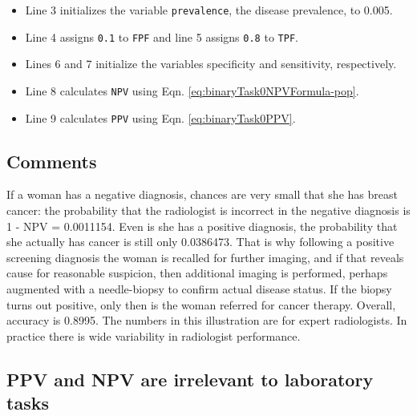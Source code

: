 \documentclass[
]{book}
\providecommand{\tightlist}{%
  \setlength{\itemsep}{0pt}\setlength{\parskip}{0pt}}
\begin{document}
\begin{itemize}
\tightlist
\item
  Line 3 initializes the variable \texttt{prevalence}, the disease prevalence, to 0.005.
\item
  Line 4 assigns \texttt{0.1} to \texttt{FPF} and line 5 assigns \texttt{0.8} to \texttt{TPF}.
\item
  Lines 6 and 7 initialize the variables specificity and sensitivity, respectively.
\item
  Line 8 calculates \texttt{NPV} using Eqn. \eqref{eq:binaryTask0NPVFormula-pop}.
\item
  Line 9 calculates \texttt{PPV} using Eqn. \eqref{eq:binaryTask0PPV}.
\end{itemize}

\hypertarget{binaryTask0NpvPpvComments}{%
\subsection{Comments}\label{binaryTask0NpvPpvComments}}

If a woman has a negative diagnosis, chances are very small that she has breast cancer: the probability that the radiologist is incorrect in the negative diagnosis is 1 - NPV = 0.0011154. Even is she has a positive diagnosis, the probability that she actually has cancer is still only 0.0386473. That is why following a positive screening diagnosis the woman is recalled for further imaging, and if that reveals cause for reasonable suspicion, then additional imaging is performed, perhaps augmented with a needle-biopsy to confirm actual disease status. If the biopsy turns out positive, only then is the woman referred for cancer therapy. Overall, accuracy is 0.8995. The numbers in this illustration are for expert radiologists. In practice there is wide variability in radiologist performance.

\hypertarget{binaryTask0NpvPpvIrrel2LabTasks}{%
\subsection{PPV and NPV are irrelevant to laboratory tasks}\label{binaryTask0NpvPpvIrrel2LabTasks}}
\end{document}
